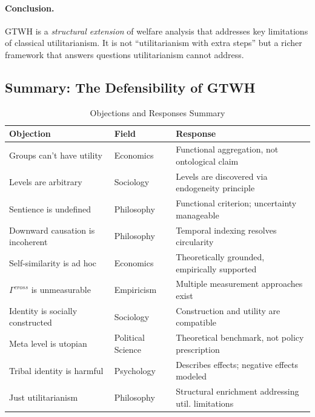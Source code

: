 \documentclass[12pt,a4paper]{article}
\begin{document}
\paragraph{Conclusion.}

GTWH is a \textit{structural extension} of welfare analysis that addresses 
key limitations of classical utilitarianism. It is not ``utilitarianism with 
extra steps'' but a richer framework that answers questions utilitarianism 
cannot address.

\subsection{Summary: The Defensibility of GTWH}

\begin{table}[htbp]
\centering
\caption{Objections and Responses Summary}
\label{tab:objections-summary}
\renewcommand{\arraystretch}{1.3}
\small
\begin{tabular}{@{}p{3cm}p{4cm}p{5.5cm}@{}}
\toprule
\textbf{Objection} & \textbf{Field} & \textbf{Response} \\
\midrule
Groups can't have utility & Economics & Functional aggregation, not ontological claim \\
Levels are arbitrary & Sociology & Levels are discovered via endogeneity principle \\
Sentience is undefined & Philosophy & Functional criterion; uncertainty manageable \\
Downward causation is incoherent & Philosophy & Temporal indexing resolves circularity \\
Self-similarity is ad hoc & Economics & Theoretically grounded, empirically supported \\
$\Gamma^{cross}$ is unmeasurable & Empiricism & Multiple measurement approaches exist \\
Identity is socially constructed & Sociology & Construction and utility are compatible \\
Meta level is utopian & Political Science & Theoretical benchmark, not policy prescription \\
Tribal identity is harmful & Psychology & Describes effects; negative effects modeled \\
Just utilitarianism & Philosophy & Structural enrichment addressing util. limitations \\
\bottomrule
\end{tabular}
\end{table}
\end{document}
